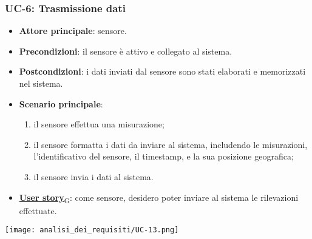 \subsubsection{UC-6: Trasmissione dati}
\begin{itemize}
	\item \textbf{Attore principale}: sensore.
	\item \textbf{Precondizioni}: il sensore è attivo e collegato al sistema.
	\item \textbf{Postcondizioni}: i dati inviati dal sensore sono stati elaborati e memorizzati nel sistema.
	\item \textbf{Scenario principale}:
	      \begin{enumerate}
		      \item il sensore effettua una misurazione;
		      \item il sensore formatta i dati da inviare al sistema, includendo le misurazioni, l'identificativo del sensore, il timestamp, e la sua posizione geografica;
		      \item il sensore invia i dati al sistema.
	      \end{enumerate}
	\item \href{https://7last.github.io/docs/rtb/documentazione-interna/glossario\#user-story}{\textbf{User story}\textsubscript{G}}: come sensore, desidero poter inviare al sistema le rilevazioni effettuate.
\end{itemize}

\begin{center}
	\texttt{[image: analisi\_dei\_requisiti/UC-13.png]}
\end{center}

